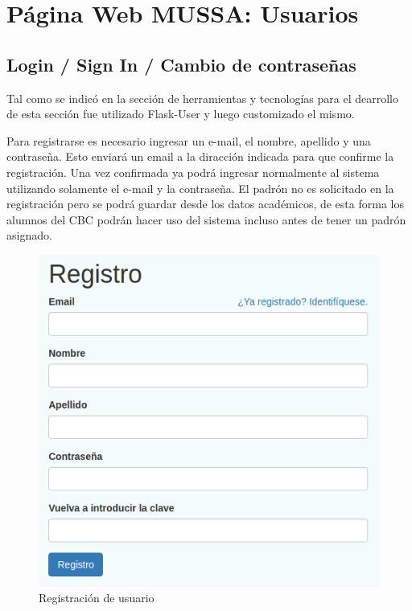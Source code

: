 \documentclass[a4paper]{article}
\begin{document}
\newpage
\section{Página Web MUSSA: Usuarios}

\subsection{Login / Sign In / Cambio de contraseñas}

Tal como se indicó en la sección de herramientas y tecnologías para el dearrollo de esta sección fue utilizado Flask-User y luego customizado el mismo.

Para registrarse es necesario ingresar un e-mail, el nombre, apellido y una contraseña. Esto enviará un email a la diracción indicada para que confirme la registración. Una vez confirmada ya podrá ingresar normalmente al sistema utilizando solamente el e-mail y la contraseña. El padrón no es solicitado en la registración pero se podrá guardar desde los datos académicos, de esta forma los alumnos del CBC podrán hacer uso del sistema incluso antes de tener un padrón asignado.

\begin{figure}[H]
\centering
\includegraphics[scale=0.4]{Imagenes/registracion.png}\par
\caption{Registración de usuario}
\end{figure}
\end{document}
